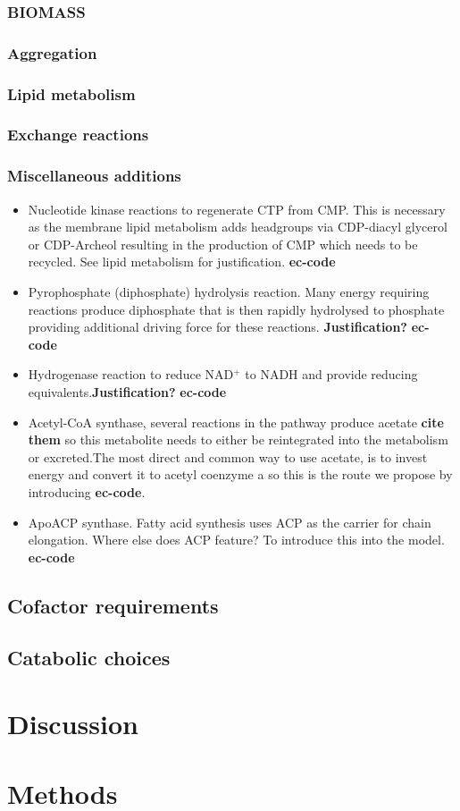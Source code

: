 \documentclass[10pt]{article}
\begin{document}
\subsubsection*{BIOMASS}
\subsubsection*{Aggregation}
\subsubsection*{Lipid metabolism}
\subsubsection*{Exchange reactions}
\subsubsection*{Miscellaneous additions}
\begin{itemize}
 \item Nucleotide kinase reactions to regenerate CTP from CMP. This is necessary as the membrane lipid metabolism adds headgroups via CDP-diacyl glycerol or CDP-Archeol resulting in the production of CMP which needs to be recycled. See lipid metabolism for justification. \textbf{ec-code}
 \item Pyrophosphate (diphosphate) hydrolysis reaction. Many energy requiring reactions produce diphosphate that is then rapidly hydrolysed to phosphate providing additional driving force for these reactions. \textbf{Justification?} \textbf{ec-code}
 \item Hydrogenase reaction to reduce NAD$^+$ to NADH and provide reducing equivalents.\textbf{Justification?} \textbf{ec-code}
 \item Acetyl-CoA synthase, several reactions in the pathway produce acetate \textbf{cite them} so this metabolite needs to either be reintegrated into the metabolism or excreted.The most direct and common way to use acetate, is to invest energy and convert it to acetyl coenzyme a so this is the route we propose by introducing \textbf{ec-code}.
 \item ApoACP synthase. Fatty acid synthesis uses ACP as the carrier for chain elongation. Where else does ACP feature? To introduce this into the model. \textbf{ec-code}
\end{itemize}

\subsection*{Cofactor requirements}
\subsection*{Catabolic choices}
\section*{Discussion}
\section*{Methods}
\end{document}
